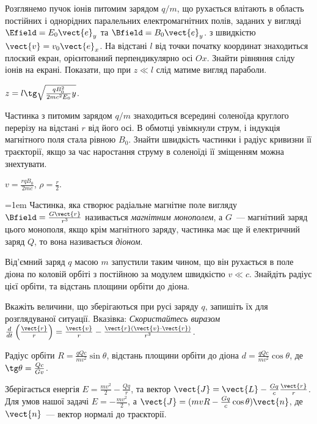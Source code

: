 \begin{problem}
Розглянемо пучок іонів питомим зарядом $q/m$, що рухається влітають в область постійних і однорідних паралельних електромагнітних полів, заданих у вигляді $\Efield = E_0\vect{e}_y$ та $\Bfield = B_0\vect{e}_y$. з швидкістю $\vect{v} = v_0 \vect{e}_x$. На відстані $l$ від точки початку координат знаходиться плоский екран, орієнтований перпендикулярно осі $Ox$. Знайти рівняння сліду іонів на екрані. Показати, що при $z \ll l$ слід матиме вигляд параболи.
\begin{solution}
	$z = l\tg\sqrt{\frac{qB_0^2}{2mc^2E_0}y}$.
\end{solution}
\end{problem}


\begin{problem}
Частинка з питомим зарядом $q/m$ знаходиться всередині соленоїда круглого перерізу на відстані $r$ від його осі. В обмотці увімкнули струм, і індукція магнітного поля стала рівною $B_0$. Знайти швидкість частинки і радіус кривизни її траєкторії, якщо за час наростання струму в соленоїді її зміщенням можна знехтувати.
\begin{solution}
	$v = \frac{rqB_0}{2mc}$, $\rho = \frac{r}{2}$.
\end{solution}
\end{problem}

\begin{problem}
\parindent=1em%
    Частинка, яка створює радіальне магнітне поле вигляду $\Bfield = \frac{G\vect{r}}{r^3}$ називається \emph{магнітним монополем}, а $G$~--- магнітний заряд цього монополя, якщо крім магнітного заряду,  частинка має ще й електричний заряд $Q$, то вона називається \emph{діоном}.

	Від'ємний заряд $q$ масою $m$ запустили таким чином, що він рухається в поле діона по коловій орбіті з постійною за модулем швидкістю $v \ll c$. Знайдіть радіус цієї орбіти, та відстань площини орбіти до діона.

	Вкажіть величини, що зберігаються при русі заряду $q$, запишіть їх для розглядуваної ситуації. Вказівка: \emph{Скористайтесь виразом $\frac{d}{dt}\left( \frac{\vect{r}}{r}\right)  = \frac{\vect{v}}{r} - \frac{\vect{r}(\vect{v}\cdot\vect{r})}{r^3}$}.
\begin{solution}
	Радіус орбіти $R = \frac{qQc}{mv^2}\sin\theta$, відстань площини орбіти до діона $d = \frac{qQc}{mv^2}\cos\theta$, де $\tg\theta = \frac{Q c}{G v}$.

	Зберігається енергія $E = \frac{mv^2}{2} - \frac{Qq}{r}$, та вектор $\vect{J} = \vect{L} - \frac{Gq}{c}\frac{\vect{r}}{r} $. Для умов нашої задачі $E = -\frac{mv^2}{2}$, а $\vect{J} = (mvR - \frac{Gq}{c}\cos\theta) \vect{n} $, де $\vect{n}$~--- вектор нормалі до траєкторії.
\end{solution}
\end{problem}


